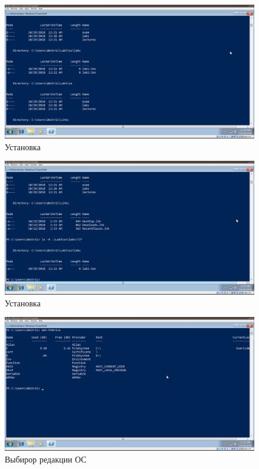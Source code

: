 \documentclass[a4paper]{article}
\begin{document}
\begin{figure}[H]
    \centering
    \includegraphics[width=\linewidth]{8.png}
    \caption{Установка}
\end{figure}

\begin{figure}[H]
    \centering
    \includegraphics[width=\linewidth]{9.png}
    \caption{Установка}
\end{figure}

\begin{figure}[H]
    \centering
    \includegraphics[width=\linewidth]{10.png}
    \caption{Выбирор редакции ОС}
\end{figure}
\end{document}
